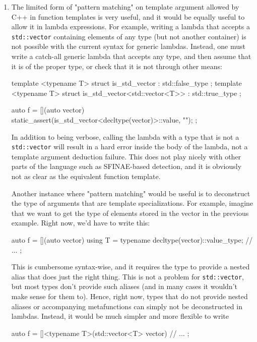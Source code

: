 \documentclass[11pt]{article}
\newcommand{\cc}[1]{\texttt{#1}}
\begin{document}
\begin{enumerate}
\item
The limited form of "pattern matching" on template argument allowed by C++
in function templates is very useful, and it would be equally useful to allow
it in lambda expressions. For example, writing a lambda that accepts a
\cc{std::vector} containing elements of any type (but not another container)
is not possible with the current syntax for generic lambdas. Instead, one
must write a catch-all generic lambda that accepts any type, and then assume
that it is of the proper type, or check that it is not through other means:

\begin{cpp}
template <typename T> struct is_std_vector                 : std::false_type { };
template <typename T> struct is_std_vector<std::vector<T>> : std::true_type { };

auto f = [](auto vector) {
  static_assert(is_std_vector<decltype(vector)>::value, "");
};
\end{cpp}

In addition to being verbose, calling the lambda with a type that is not a
\cc{std::vector} will result in a hard error inside the body of the lambda, not
a template argument deduction failure. This does not play nicely with other
parts of the language such as SFINAE-based detection, and it is obviously
not as clear as the equivalent function template.

Another instance where "pattern matching" would be useful is to deconstruct
the type of arguments that are template specializations. For example, imagine
that we want to get the type of elements stored in the vector in the previous
example. Right now, we'd have to write this:

\begin{cpp}
auto f = [](auto vector) {
  using T = typename decltype(vector)::value_type;
  // ...
};
\end{cpp}

This is cumbersome syntax-wise, and it requires the type to provide a nested
alias that does just the right thing. This is not a problem for \cc{std::vector},
but most types don't provide such aliases (and in many cases it wouldn't make
sense for them to). Hence, right now, types that do not provide nested aliases
or accompanying metafunctions can simply not be deconstructed in lambdas.
Instead, it would be much simpler and more flexible to write

\begin{cpp}
auto f = []<typename T>(std::vector<T> vector) {
  // ...
};
\end{cpp}



\end{enumerate}
\end{document}
